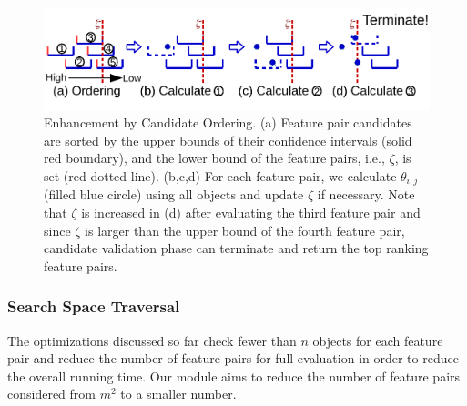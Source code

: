 \begin{figure}[h]
 \centering
 \vspace{-10mm}
 \includegraphics[width=\linewidth]{fig/candidate_ordering.pdf}
 \vspace{-8mm}
\caption{Enhancement by Candidate Ordering. (a) Feature pair candidates are sorted by the upper bounds of their confidence intervals (solid red boundary), and the lower bound of the \topthree feature pairs, i.e., $\zeta$, is set (red dotted line). (b,c,d) For each feature pair, we calculate $\theta_{i,j}$ (filled blue circle) using all objects and update $\zeta$ if necessary. Note that $\zeta$ is increased in (d) after evaluating the third feature pair and since $\zeta$ is larger than the upper bound of the fourth feature pair, candidate validation phase can terminate and return the top ranking feature pairs.}
\vspace{-5mm}
\label{fig:candidate_ordering}
\end{figure}


\subsubsection{Search Space Traversal} \label{ssec:traversal}

The optimizations discussed so far check fewer than $n$ objects for each feature pair and reduce the number of feature pairs for full evaluation in order to reduce the overall running time. Our \traversal module aims to reduce the number of feature pairs considered from $m^2$ to a smaller number.

